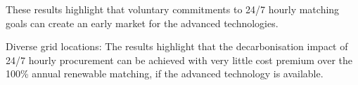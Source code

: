 \lipsum[4]
\lipsum[4]

These results highlight that voluntary commitments to 24/7 hourly matching goals can create an early market for the advanced technologies.

Diverse grid locations:
The results highlight that the decarbonisation impact of 24/7 hourly procurement can be achieved with very little cost premium over the 100\% annual renewable matching, if the advanced technology is available.
